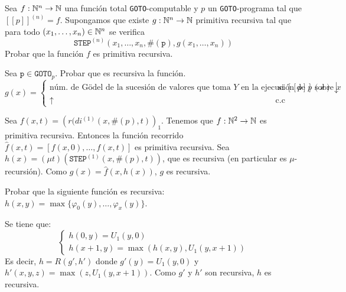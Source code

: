 \documentclass[twoside]{article}
\begin{document}
\begin{ejercicio}{10}
Sea $f : \mathbb{N}^n \to \mathbb{N}$ una función total \texttt{GOTO}-computable y $p$ un \texttt{GOTO}-programa tal que $[\![p]\!]^{(n)} = f$. Supongamos que existe $g : \mathbb{N}^n \to \mathbb{N}$ primitiva recursiva tal que para todo $(x_1,\dots,x_n) \in \mathbb{N}^n$ se verifica
\[ \texttt{STEP}^{(n)}(x_1,\dots,x_n,\#(\texttt{p}),g(x_1,\dots,x_n)) \]
Probar que la función $f$ es primitiva recursiva.
\end{ejercicio}
\begin{solucion}
\end{solucion}
\newpage
\begin{ejercicio}{11}
Sea $\texttt{p} \in \texttt{GOTO}_p$. Probar que es recursiva la función.
\[ g(x) = \begin{cases}
	\text{núm. de Gödel de la sucesión de valores que toma }Y\text{ en la ejecución de }p\text{ sobre }x &\text{ si }[\![p]\!](x)\downarrow\\
	\uparrow & \text{c.c}
\end{cases} \]
\end{ejercicio}
\begin{solucion}
Sea $f(x,t)=\left(r(di^{(1)}(x,\#(p),t)\right)_1$. Tenemos que $f : \mathbb{N}^2 \to \mathbb{N}$ es primitiva recursiva. Entonces la función recorrido $\hat{f}(x,t) = [f(x,0),\dots,f(x,t)]$ es primitiva recursiva. Sea $h(x) = (μt) (\texttt{STEP}^{(1)} (x,\#(p),t))$, que es recursiva (en particular es $μ$-recursión). Como $g(x) = \hat{f}(x,h(x))$, $g$ es recursiva.
\end{solucion}

\newpage
\begin{ejercicio}{12}
Probar que la siguiente función es recursiva: $h(x,y) = \max\{φ_0(y),\dots,φ_x(y)\}$.
\end{ejercicio}
\begin{solucion}
Se tiene que:
\[ \begin{cases}
	h(0,y) = U_1(y,0)\\
	h(x+1,y) = \max(h(x,y),U_1(y,x+1))
\end{cases}\]
Es decir, $h = R(g',h')$ donde $g'(y) = U_1(y,0)$ y $h'(x,y,z)=\max(z,U_1(y,x+1))$. Como $g'$ y $h'$ son recursiva, $h$ es recursiva.
\end{solucion}

\newpage
\end{document}
